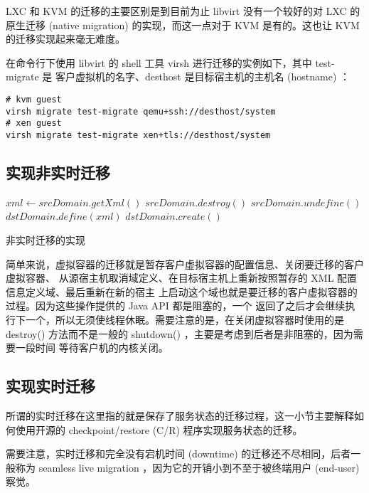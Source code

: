
LXC 和 KVM 的迁移的主要区别是到目前为止 libvirt 没有一个较好的对 LXC 的原生迁移 (native
 migration) 的实现，而这一点对于 KVM 是有的。这也让 KVM 的迁移实现起来毫无难度。

在命令行下使用 libvirt 的 shell 工具 virsh 进行迁移的实例如下，其中 test-migrate 是
客户虚拟机的名字、desthost 是目标宿主机的主机名 (hostname) ：

\begin{lstlisting}
# kvm guest
virsh migrate test-migrate qemu+ssh://desthost/system
# xen guest
virsh migrate test-migrate xen+tls://desthost/system
\end{lstlisting}

\subsection{实现非实时迁移}

\begin{algorithm}
    \begin{algorithmic}
        \State $xml \gets srcDomain.getXml()$
            \State $srcDomain.destroy()$
        \EndIf
        \State $srcDomain.undefine()$
        \State $dstDomain.define(xml)$
        \State $dstDomain.create()$
    \EndIf
    \end{algorithmic}
    \caption{非实时迁移的实现}
\end{algorithm}

简单来说，虚拟容器的迁移就是暂存客户虚拟容器的配置信息、关闭要迁移的客户虚拟容器、
从源宿主机取消域定义、在目标宿主机上重新按照暂存的 XML 配置信息定义域、最后重新在新的宿主
上启动这个域也就是要迁移的客户虚拟容器的过程。因为这些操作提供的 Java API 都是阻塞的，一个
返回了之后才会继续执行下一个，所以无须使线程休眠。需要注意的是，在关闭虚拟容器时使用的是
destroy() 方法而不是一般的 shutdown() ，主要是考虑到后者是非阻塞的，因为需要一段时间
等待客户机的内核关闭。

\subsection{实现实时迁移}

所谓的实时迁移在这里指的就是保存了服务状态的迁移过程，这一小节主要解释如何使用开源的
checkpoint/restore (C/R) 程序实现服务状态的迁移。

需要注意，实时迁移和完全没有宕机时间 (downtime) 的迁移还不尽相同，后者一般称为
seamless live migration ，因为它的开销小到不至于被终端用户 (end-user) 察觉。

